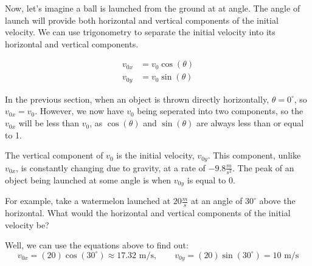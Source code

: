 Now, let's imagine a ball is launched from the ground at at angle. The angle of launch will provide both horizontal and vertical components of the initial velocity. We can use trigonometry to separate the initial velocity into its horizontal and vertical components.

\begin{align*}
v_{0x} &= v_0 \cos(\theta) \\
v_{0y} &= v_0 \sin(\theta)
\end{align*}

In the previous section, when an object is thrown directly horizontally, $\theta = 0 ^\circ$, so $v_{0x} = v_0$. However, we now have $v_{0}$ being seperated into two components, so the $v_{0x}$ will be less than $v_0$, as $\cos(\theta)$ and $\sin(\theta)$ are always less than or equal to 1.

The vertical component of $v_0$ is the initial velocity, $v_{0y}$. This component, unlike $v_{0x}$, is constantly changing due to gravity, at a rate of $-9.8 \frac{m}{s^2}$. The peak of an object being launched at some angle is when $v_{0y}$ is equal to 0. 


\begin{center}
\end{center}

For example, take a watermelon launched at $20 \frac{m}{s}$ at an angle of $30^\circ$ above the horizontal. What would the horizontal and vertical components of the initial velocity be?

Well, we can use the equations above to find out:
$$
v_{0x} = (20) \cos(30^\circ) \approx 17.32 \text{ m/s}, \qquad v_{0y} = (20) \sin(30^\circ) = 10 \text{ m/s}
$$

